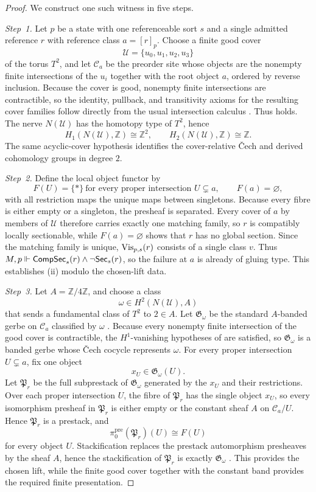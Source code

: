 \begin{proof}
We construct one such witness in five steps.

\emph{Step~1.}
Let $p$ be a state with one referenceable sort $s$ and a single admitted reference $r$ with reference class $a=[r]_p$. Choose a finite good cover
\[
\mathcal U=\{u_0,u_1,u_2,u_3\}
\]
of the torus $T^2$, and let $\mathcal C_a$ be the preorder site whose objects are the nonempty finite intersections of the $u_i$ together with the root object $a$, ordered by reverse inclusion. Because the cover is good, nonempty finite intersections are contractible, so the identity, pullback, and transitivity axioms for the resulting cover families follow directly from the usual intersection calculus \cite[Chap.~IV]{Giraud1971}. Thus  holds. The nerve $N(\mathcal U)$ has the homotopy type of $T^2$, hence
\[
H_1(N(\mathcal U),\mathbb Z)\cong\mathbb Z^2,
\qquad
H_2(N(\mathcal U),\mathbb Z)\cong\mathbb Z.
\]
The same acyclic-cover hypothesis identifies the cover-relative \v{C}ech and derived cohomology groups in degree $2$.

\emph{Step~2.}
Define the local object functor by
\[
F(U)=\{*\}\ \text{for every proper intersection }U\subsetneq a,
\qquad
F(a)=\varnothing,
\]
with all restriction maps the unique maps between singletons. Because every fibre is either empty or a singleton, the presheaf is separated. Every cover of $a$ by members of $\mathcal U$ therefore carries exactly one matching family, so $r$ is compatibly locally sectionable, while $F(a)=\varnothing$ shows that $r$ has no global section. Since the matching family is unique, $\mathrm{Vis}_{p,s}(r)$ consists of a single class $v$. Thus $M,p\Vdash \mathsf{CompSec}_s(r)\land \neg\mathsf{Sec}_s(r)$, so the failure at $a$ is already of gluing type. This establishes \textup{(ii)} modulo the chosen-lift data.

\emph{Step~3.}
Let $A=\mathbb Z/4\mathbb Z$, and choose a class
\[
\omega\in H^2(N(\mathcal U),A)
\]
that sends a fundamental class of $T^2$ to $2\in A$. Let $\mathfrak G_{\omega}$ be the standard $A$-banded gerbe on $\mathcal C_a$ classified by $\omega$ \cite[Chap.~IV]{Giraud1971}. Because every nonempty finite intersection of the good cover is contractible, the $H^1$-vanishing hypotheses of  are satisfied, so $\mathfrak G_{\omega}$ is a banded gerbe whose \v{C}ech cocycle represents $\omega$. For every proper intersection $U\subsetneq a$, fix one object
\[
x_U\in \mathfrak G_{\omega}(U).
\]
Let $\mathfrak P_r$ be the full subprestack of $\mathfrak G_{\omega}$ generated by the $x_U$ and their restrictions. Over each proper intersection $U$, the fibre of $\mathfrak P_r$ has the single object $x_U$, so every isomorphism presheaf in $\mathfrak P_r$ is either empty or the constant sheaf $A$ on $\mathcal C_a/U$. Hence $\mathfrak P_r$ is a prestack, and
\[
\pi_0^{\mathrm{pre}}(\mathfrak P_r)(U)\cong F(U)
\]
for every object $U$. Stackification replaces the prestack automorphism presheaves by the sheaf $A$, hence the stackification of $\mathfrak P_r$ is exactly $\mathfrak G_{\omega}$ \cite[Tag~02ZP]{StacksProject}. This provides the chosen lift, while the finite good cover together with the constant band provides the required finite presentation.


\end{proof}
